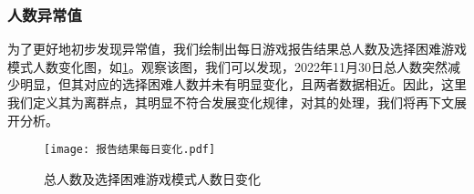 \documentclass{MathModeling}
\begin{document}
	\subsubsection{人数异常值}
	为了更好地初步发现异常值，我们绘制出每日游戏报告结果总人数及选择困难游戏模式人数变化图，如\textcolor{blue}{\cref{fig:总人数及选择困难游戏模式人数变化图}}。观察该图，我们可以发现，2022年11月30日总人数突然减少明显，但其对应的选择困难人数并未有明显变化，且两者数据相近。因此，这里我们定义其为离群点，其明显不符合发展变化规律，对其的处理，我们将再下文展开分析。
	\begin{figure}[H]
		\centering
		\texttt{[image: 报告结果每日变化.pdf]}
		\caption{总人数及选择困难游戏模式人数日变化}
		\label{fig:总人数及选择困难游戏模式人数变化图}
	\end{figure}
\end{document}
